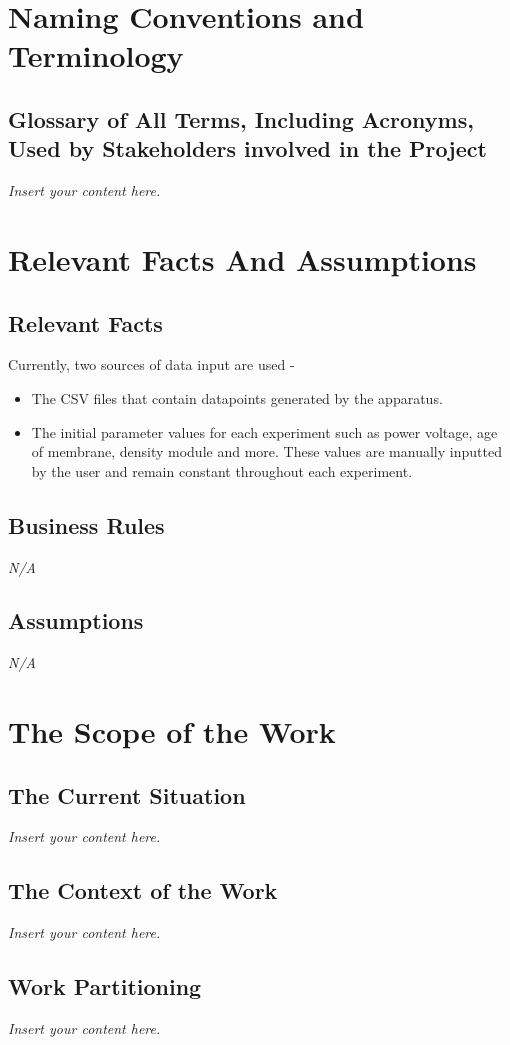 \documentclass[12pt]{article}
\newcommand{\lips}{\textit{Insert your content here.}}
\begin{document}
\section{Naming Conventions and Terminology}
\subsection{Glossary of All Terms, Including Acronyms, Used by Stakeholders
involved in the Project}
\lips
\section{Relevant Facts And Assumptions}
\subsection{Relevant Facts}
Currently, two sources of data input are used -
\begin{itemize}
  \item The CSV files that contain datapoints generated by the apparatus.
  \item The initial parameter values for each experiment such as power voltage, age of membrane, density module and more. These values are manually inputted by the user 
  and remain constant throughout each experiment.
\end{itemize}

\subsection{Business Rules}
\emph{N/A}
\subsection{Assumptions}
\emph{N/A}

\section{The Scope of the Work}
\subsection{The Current Situation}
\lips
\subsection{The Context of the Work}
\lips
\subsection{Work Partitioning}
\lips
\end{document}
